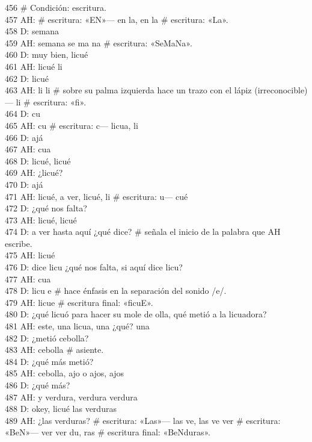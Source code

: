 456 \# Condición: escritura.\\
457 AH: \# escritura: «EN»--- en la, en la \# escritura: «La».\\
458 D: semana\\
459 AH: semana se ma na \# escritura: «SeMaNa».\\
460 D: muy bien, licué\\
461 AH: licué li\\
462 D: licué\\
463 AH: li li \# sobre su palma izquierda hace un trazo con el lápiz (irreconocible)--- li \# escritura: «fi».\\
464 D: cu\\
465 AH: cu \# escritura: c--- licua, li\\
466 D: ajá\\
467 AH: cua\\
468 D: licué, licué\\
469 AH: ¿licué?\\
470 D: ajá\\
471 AH: licué, a ver, licué, li \# escritura: u--- cué\\
472 D: ¿qué nos falta?\\
473 AH: licué, licué\\
474 D: a ver hasta aquí ¿qué dice? \# señala el inicio de la palabra que AH escribe.\\
475 AH: licué\\
476 D: dice licu ¿qué nos falta, si aquí dice licu?\\
477 AH: cua\\
478 D: licu e \# hace énfasis en la separación del sonido /e/.\\
479 AH: licue \# escritura final: «ficuE».\\
480 D: ¿qué licuó para hacer su mole de olla, qué metió a la licuadora?\\
481 AH: este, una licua, una ¿qué? una\\
482 D: ¿metió cebolla?\\
483 AH: cebolla \# asiente.\\
484 D: ¿qué más metió?\\
485 AH: cebolla, ajo o ajos, ajos\\
486 D: ¿qué más?\\
487 AH: y verdura, verdura verdura\\
488 D: okey, licué las verduras\\
489 AH: ¿las verduras? \# escritura: «Las»--- las ve, las ve ver \# escritura: «BeN»---  ver ver du, ras \# escritura final: «BeNduras».\\
